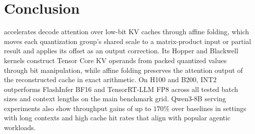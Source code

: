 \section{Conclusion}
\label{sec:conclusion}

\sys{} accelerates decode attention over low-bit KV caches through affine folding, which moves each quantization group's shared scale to a matrix-product input or partial result and applies its offset as an output correction.
Its Hopper and Blackwell kernels construct Tensor Core KV operands from packed quantized values through bit manipulation, while affine folding preserves the attention output of the reconstructed cache in exact arithmetic.
On H100 and B200, \sys{} INT2 outperforms FlashInfer BF16 and TensorRT-LLM FP8 across all tested batch sizes and context lengths on the main benchmark grid.
Qwen3-8B serving experiments also show throughput gains of up to $170\%$ over baselines in settings with long contexts and high cache hit rates that align with popular agentic workloads.
